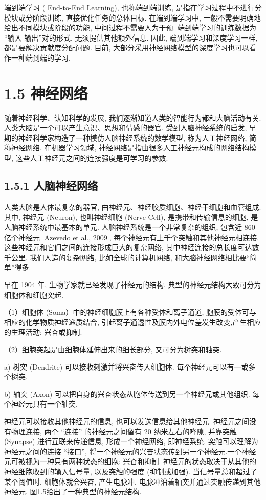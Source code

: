 \documentclass[10pt]{article}
\begin{document}
端到端学习 ( End-to-End Learning), 也称端到端训练, 是指在学习过程中不进行分模块或分阶段训练, 直接优化任务的总体目标. 在端到端学习中, 一般不需要明确地给出不同模块或阶段的功能, 中间过程不需要人为干预. 端到端学习的训练数据为 “输入-输出”对的形式, 无须提供其他额外信息. 因此, 端到端学习和深度学习一样, 都是要解决贡献度分配问题. 目前, 大部分采用神经网络模型的深度学习也可以看作一种端到端的学习.

\section*{1.5 神经网络}
随着神经科学、认知科学的发展, 我们逐渐知道人类的智能行为都和大脑活动有关. 人类大脑是一个可以产生意识、思想和情感的器官. 受到人脑神经系统的启发, 早期的神经科学家构造了一种模仿人脑神经系统的数学模型, 称为人工神经网络, 简称神经网络. 在机器学习领域, 神经网络是指由很多人工神经元构成的网络结构模型, 这些人工神经元之间的连接强度是可学习的参数.

\subsection*{1.5.1 人脑神经网络}
人类大脑是人体最复杂的器官, 由神经元、神经胶质细胞、神经干细胞和血管组成. 其中, 神经元 (Neuron), 也叫神经细胞 (Nerve Cell), 是携带和传输信息的细胞, 是人脑神经系统中最基本的单元. 人脑神经系统是一个非常复杂的组织, 包含近 860 亿个神经元 [Azevedo et al., 2009], 每个神经元有上千个突触和其他神经元相连接. 这些神经元和它们之间的连接形成巨大的复杂网络, 其中神经连接的总长度可达数千公里. 我们人造的复杂网络, 比如全球的计算机网络, 和大脑神经网络相比要“简单”得多.

早在 1904 年, 生物学家就已经发现了神经元的结构. 典型的神经元结构大致可分为细胞体和细胞突起.

（1）细胞体 (Soma）中的神经细胞膜上有各种受体和离子通道, 胞膜的受体可与相应的化学物质神经递质结合, 引起离子通透性及膜内外电位差发生改变,产生相应的生理活动: 兴奋或抑制.

（2）细胞突起是由细胞体延伸出来的细长部分, 又可分为树突和轴突.

a) 树突 (Dendrite) 可以接收刺激并将兴奋传入细胞体. 每个神经元可以有一或多个树突.

b) 轴突 (Axon) 可以把自身的兴奋状态从胞体传送到另一个神经元或其他组织. 每个神经元只有一个轴突.

神经元可以接收其他神经元的信息, 也可以发送信息给其他神经元. 神经元之间没有物理连接, 两个 “连接” 的神经元之间留有 20 纳米左右的㖓隙, 并靠突触 (Synapse) 进行互联来传递信息, 形成一个神经网络, 即神经系统. 突触可以理解为神经元之间的连接 “接口”, 将一个神经元的兴奋状态传到另一个神经元.一个神经元可被视为一种只有两种状态的细胞: 兴奋和抑制. 神经元的状态取决于从其他的神经细胞收到的输入信号量, 以及突触的强度 (抑制或加强). 当信号量总和超过了某个阈值时, 细胞体就会兴奋, 产生电脉冲. 电脉冲沿着轴突并通过突触传递到其他神经元. 图1.5给出了一种典型的神经元结构.
\end{document}
